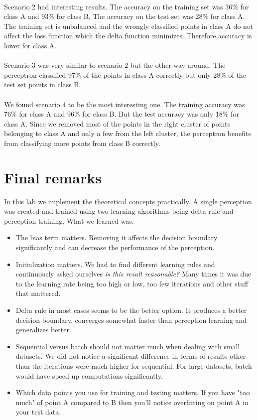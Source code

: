 \documentclass[a4paper]{article}
\begin{document}
\\Scenario 2 had interesting results. The accuracy on the training set was 36\% for class A and 93\% for class B. The accuracy on the test set was 28\% for class A. The training set is unbalanced and the wrongly classified points in class A do not affect the loss function which the delta function minimizes. Therefore accuracy is lower for class A.\\
\\Scenario 3 was very similar to scenario 2 but the other way around. The perceptron classified 97\% of the points in class A correctly but only 28\% of the test set points in class B.\\
\\We found scenario 4 to be the most interesting one. The training accuracy was 76\% for class A and 96\% for class B. But the test accuracy was only 18\% for class A. Since we removed most of the points in the right cluster of points belonging to class A and only a few from the left cluster, the perceptron benefits from classifying more points from class B correctly.
\section{Final remarks} 
In this lab we implement the theoretical concepts practically. A single perception was created and trained using two learning algorithms being delta rule and perception training. What we learned was:
\begin{itemize}
    \item The bias term matters. Removing it affects the decision boundary significantly and can decrease the performance of the perception.
    \item Initialization matters. We had to find different learning rules and continuously asked ourselves \textit{is this result reasonable?} Many times it was due to the learning rate being too high or low, too few iterations and other stuff that mattered. 
    \item Delta rule in most cases seems to be the better option. It produces a better decision boundary, converges somewhat faster than perception learning and generalizes better. 
    \item Sequential versus batch should not matter much when dealing with small datasets. We did not notice a significant difference in terms of results other than the iterations were much higher for sequential. For large datasets, batch would have speed up computations significantly. 
    \item Which data points you use for training and testing matters. If you have "too much" of point A compared to B then you'll notice overfitting on  point A in your test data. \end{itemize}
\end{document}
